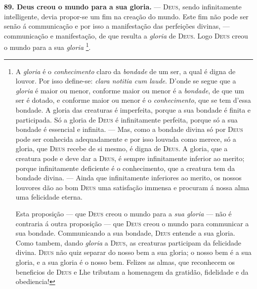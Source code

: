  \textbf{89. Deus creou o mundo para a sua gloria.} --- \textsc{Deus}, sendo infinitamente intelligente, devia propor-se um fim na creação do mundo. Este fim não pode ser senão á communicação e por isso a manifestação das perfeições divinas, --- communicação e manifestação, de que resulta a \emph{gloria} de \textsc{Deus}. Logo \textsc{Deus} creou o mundo para a sua \emph{gloria} \footnote{A \emph{gloria} é o \emph{conhecimento} claro da \emph{bondade} de um ser, a qual é digna de louvor. Por isso define-se: \emph{clara notitia cum laude}. D'onde se segue que a \emph{gloria} é maior ou menor, conforme maior ou menor é a \emph{bondade}, de que um ser é dotado, e conforme maior ou menor é o \emph{conhecimento}, que se tem d'essa bondade. A gloria das creaturas é imperfeita, porque a sua bondade é finita e participada. Só a gloria de \textsc{Deus} é infinitamente perfeita, porque só a sua bondade é essencial e infinita. --- Mas, como a bondade divina só por \textsc{Deus} pode ser conhecida adequadamente e por isso louvada como merece, só a gloria, que \textsc{Deus} recebe de si mesmo, é digna de \textsc{Deus}. A gloria, que a creatura pode e deve dar a \textsc{Deus}, é sempre infinitamente inferior ao merito; porque infinitamente deficiente é o conhecimento, que a creatura tem da bondade divina. --- Ainda que infinitamente inferiores ao merito, os nossos louvores dão ao bom \textsc{Deus} uma satisfação immensa e procuram á nossa alma uma felicidade eterna.\par Esta proposição --- que \textsc{Deus} creou o mundo para a \emph{sua gloria} --- não é contraria á outra proposição --- que \textsc{Deus} creou o mundo para communicar a sua bondade. Communicando a sua bondade, \textsc{Deus} entende a sua gloria. Como tambem, dando \emph{gloria} a \textsc{Deus}, as creaturas participam da felicidade divina. \textsc{Deus} não quiz separar do nosso bem a sua gloria; o nosso bem é a sua gloria, e a sua gloria é o nosso bem. Felizes as almas, que reconhecem os beneficios de \textsc{Deus} e Lhe tributam a homenagem da gratidão, fidelidade e da obediencia!}.
